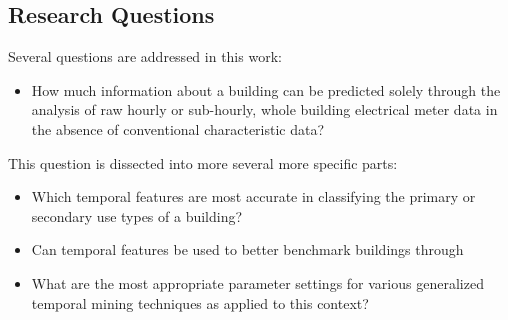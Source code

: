 \subsection{Research Questions}
Several questions are addressed in this work:
\begin{itemize}
\item How much information about a building can be predicted solely through the analysis of raw hourly or sub-hourly, whole building electrical meter data in the absence of conventional characteristic data? 
\end{itemize}
This question is dissected into more several more specific parts:
\begin{itemize}
\item Which temporal features are most accurate in classifying the primary or secondary use types of a building?
\item Can temporal features be used to better benchmark buildings through
\item What are the most appropriate parameter settings for various generalized temporal mining techniques as applied to this context?
\end{itemize}






